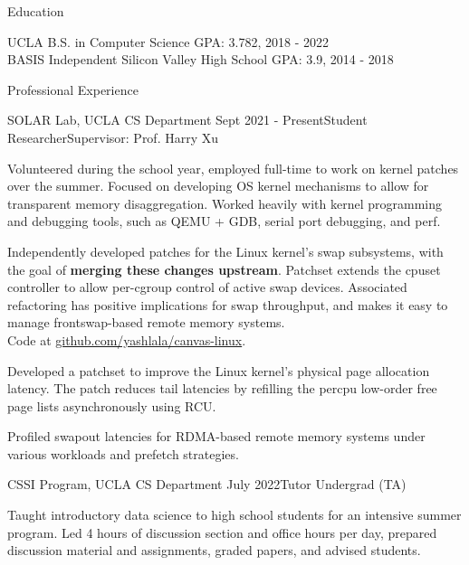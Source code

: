 \documentclass{resume} %
\begin{document}
\begin{resumeSection}{Education}

UCLA B.S. in Computer Science
	\hfill GPA: 3.782, 2018 - 2022 \\
BASIS Independent Silicon Valley High School
	\hfill GPA: 3.9, 2014 - 2018

\end{resumeSection}


\begin{resumeSection}{Professional Experience} \itemsep -12pt

\begin{resumeSubsection}{SOLAR Lab, UCLA CS Department} 
	{Sept 2021 - Present}{Student Researcher}{Supervisor: Prof. Harry Xu}
\item Volunteered during the school year, employed full-time to work on kernel
	patches over the summer. Focused on developing OS kernel mechanisms to
	allow for transparent memory disaggregation. Worked heavily with kernel
	programming and debugging tools, such as QEMU + GDB, serial port
	debugging, and perf. 
\item Independently developed patches for the Linux kernel's swap subsystems,
	with the goal of \textbf{merging these changes upstream}. Patchset
	extends the cpuset controller to allow per-cgroup control of active
	swap devices. Associated refactoring has positive implications for swap
	throughput, and makes it easy to manage frontswap-based remote memory
	systems. \\
	Code at 
	\href{https://github.com/yashlala/canvas-linux}{github.com/yashlala/canvas-linux}.
\item Developed a patchset to improve the Linux kernel's physical page
	allocation latency. The patch reduces tail latencies by refilling the
	percpu low-order free page lists asynchronously using RCU. 
\item Profiled swapout latencies for RDMA-based remote memory systems under
	various workloads and prefetch strategies. 
\end{resumeSubsection}

\begin{resumeSubsection}{CSSI Program, UCLA CS Department}
	{July 2022}{Tutor Undergrad (TA)}{}
\item Taught introductory data science to high school students for an intensive
	summer program. Led 4 hours of discussion section and office hours per
	day, prepared discussion material and assignments, graded papers, and
	advised students. 
\end{resumeSubsection}


\end{resumeSection}
\end{document}
